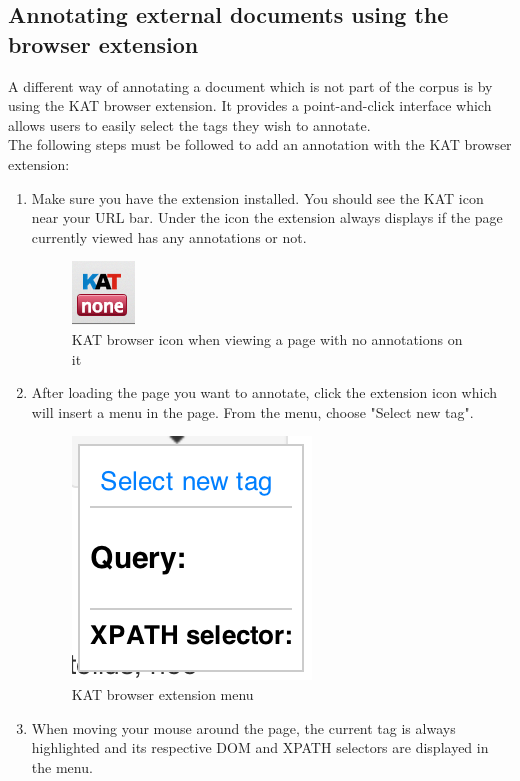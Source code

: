 \subsection{Annotating external documents using the browser extension}
A different way of annotating a document which is not part of the corpus is by
using the KAT browser extension. It provides a point-and-click interface which
allows users to easily select the tags they wish to annotate. \\
The following steps must be followed to add an annotation with the KAT browser extension:
\begin{enumerate}
\item Make sure you have the extension installed. You should see the KAT icon near your URL bar.
  Under the icon the extension always displays if the page currently viewed has any annotations or not.
  \begin{figure}[ht]\centering
  \includegraphics{figures/extension-browser-icon-none}
  \caption{KAT browser icon when viewing a page with no annotations on it}\label{fig:extension-browser-icon-none}
  \end{figure}
\item After loading the page you want to annotate, click the extension icon which will insert a menu in the page. From the menu, choose "Select new tag".
  \begin{figure}[ht]\centering
  \includegraphics{figures/extension-menu}
  \caption{KAT browser extension menu}\label{fig:extension-menu}
  \end{figure}
\item When moving your mouse around the page, the current tag is always highlighted and its respective DOM and XPATH selectors are displayed in the menu.

\end{enumerate}
